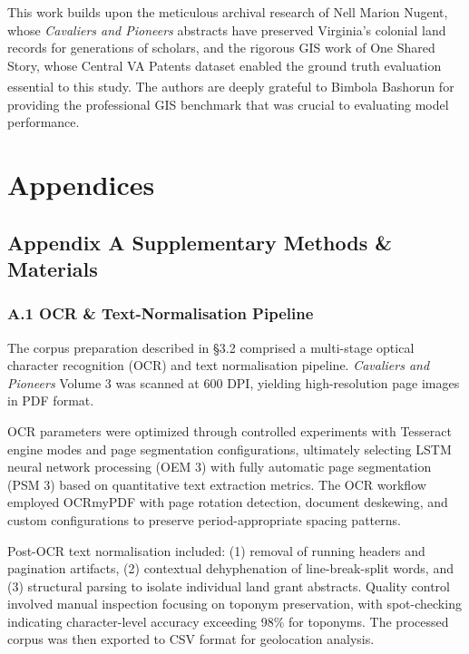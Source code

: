 \documentclass[
  10pt,
  twocolumn]{article}
\begin{document}
This work builds upon the meticulous archival research of Nell Marion
Nugent, whose \emph{Cavaliers and Pioneers} abstracts have preserved
Virginia's colonial land records for generations of scholars, and the
rigorous GIS work of One Shared Story, whose Central VA Patents dataset
enabled the ground truth evaluation essential to this study. The authors
are deeply grateful to Bimbola
Bashorun\textsuperscript{} for
providing the professional GIS benchmark that was crucial to evaluating
model performance.

\onecolumn
\section{Appendices}\label{appendices}

\subsection{Appendix A Supplementary Methods \&
Materials}\label{appendix-a-supplementary-methods-materials}

\subsubsection{A.1 OCR \& Text-Normalisation
Pipeline}\label{a.1-ocr-text-normalisation-pipeline}

The corpus preparation described in §3.2 comprised a multi-stage optical
character recognition (OCR) and text normalisation pipeline.
\emph{Cavaliers and Pioneers} Volume 3 was scanned at 600 DPI, yielding
high-resolution page images in PDF format.

OCR parameters were optimized through controlled experiments with
Tesseract engine modes and page segmentation configurations, ultimately
selecting LSTM neural network processing (OEM 3) with fully automatic
page segmentation (PSM 3) based on quantitative text extraction metrics.
The OCR workflow employed OCRmyPDF with page rotation detection,
document deskewing, and custom configurations to preserve
period-appropriate spacing patterns.

Post-OCR text normalisation included: (1) removal of running headers and
pagination artifacts, (2) contextual dehyphenation of line-break-split
words, and (3) structural parsing to isolate individual land grant
abstracts. Quality control involved manual inspection focusing on
toponym preservation, with spot-checking indicating character-level
accuracy exceeding 98\% for toponyms. The processed corpus was then
exported to CSV format for geolocation analysis.
\end{document}
